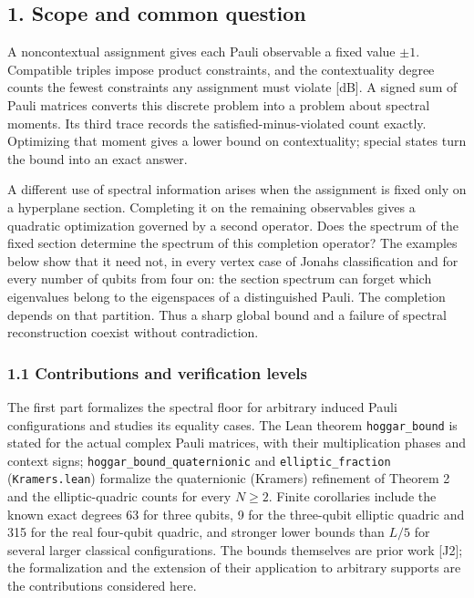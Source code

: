 \documentclass[11pt,a4paper]{article}
\begin{document}
\subsection{1. Scope and common question}\label{1-scope-and-common-question}

A noncontextual assignment gives each Pauli observable a fixed value \(\pm1\). Compatible triples
impose product constraints, and the contextuality degree counts the fewest constraints any assignment
must violate {[}dB{]}. A signed sum of Pauli matrices converts this discrete problem into a problem about
spectral moments. Its third trace records the satisfied-minus-violated count exactly. Optimizing that
moment gives a lower bound on contextuality; special states turn the bound into an exact answer.

A different use of spectral information arises when the assignment is fixed only on a hyperplane
section. Completing it on the remaining observables gives a quadratic optimization governed by a
second operator. Does the spectrum of the fixed section determine the spectrum of this completion
operator? The examples below show that it need not, in every vertex case of Jonah\textquotesingle s classification
and for every number of qubits from four on: the section spectrum can forget which eigenvalues belong
to the eigenspaces of a distinguished Pauli. The completion depends on that partition. Thus a sharp
global bound and a failure of spectral reconstruction coexist without contradiction.

\subsubsection{1.1 Contributions and verification levels}\label{11-contributions-and-verification-levels}

The first part formalizes the spectral floor for arbitrary induced Pauli configurations and studies
its equality cases. The Lean theorem \texttt{hoggar\_bound} is stated for the actual complex Pauli matrices,
with their multiplication phases and context signs; \nolinkurl{hoggar_bound_quaternionic} and \texttt{elliptic\_fraction}
(\texttt{Kramers.lean}) formalize the quaternionic (Kramers) refinement of Theorem 2 and the elliptic-quadric
counts for every \(N\ge2\). Finite corollaries include the known exact degrees 63 for three qubits, 9 for
the three-qubit elliptic quadric and 315 for the real four-qubit quadric, and stronger lower bounds than
\(L/5\) for several larger classical configurations. The bounds themselves are prior work {[}J2{]}; the
formalization and the extension of their application to arbitrary supports are the contributions
considered here.
\end{document}
